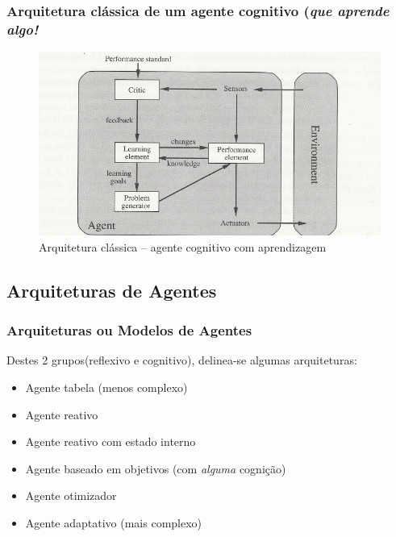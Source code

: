 \begin{frame}

  \frametitle{Arquitetura clássica de um agente cognitivo (\textit{que aprende algo!}}
    
\begin{figure}[!ht]
\centering
\includegraphics[height =.6\textheight,width=.7\textwidth]{figuras/agente_aprendizagem.pdf}
\caption{Arquitetura clássica -- agente cognitivo com aprendizagem}
\label{ag_02}
\end{figure}
    
\end{frame}



\subsection{Arquiteturas de Agentes}
\begin{frame} %

\frametitle{Arquiteturas ou Modelos de Agentes}

\begin{block}{Destes 2 grupos(reflexivo e cognitivo), delinea-se algumas arquiteturas:}
  
    \begin{itemize}
      \item Agente tabela (menos complexo)
      \item Agente reativo
      \item Agente reativo com estado interno 
      \item Agente baseado em objetivos (com \textit{alguma} cognição)
      \item Agente otimizador
      \item Agente adaptativo (mais complexo)
    \end{itemize}
  
\end{block}

\end{frame}


